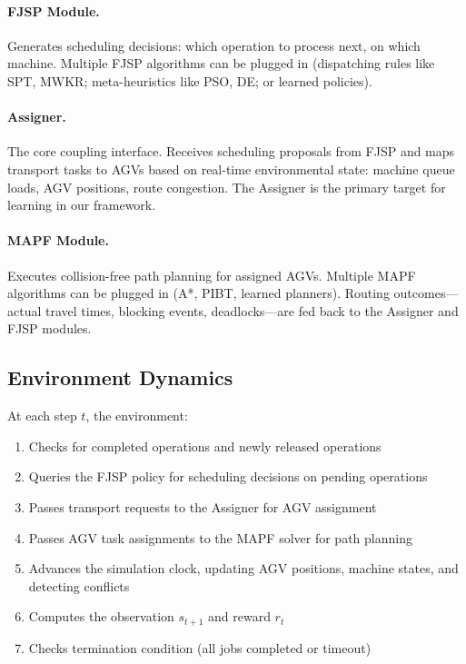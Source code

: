 \documentclass[11pt,a4paper]{article}
\begin{document}
\paragraph{FJSP Module.}
Generates scheduling decisions: which operation to process next, on which machine. Multiple FJSP algorithms can be plugged in (dispatching rules like SPT, MWKR; meta-heuristics like PSO, DE; or learned policies).

\paragraph{Assigner.}
The core coupling interface. Receives scheduling proposals from FJSP and maps transport tasks to AGVs based on real-time environmental state: machine queue loads, AGV positions, route congestion. The Assigner is the primary target for learning in our framework.

\paragraph{MAPF Module.}
Executes collision-free path planning for assigned AGVs. Multiple MAPF algorithms can be plugged in (A*, PIBT, learned planners). Routing outcomes---actual travel times, blocking events, deadlocks---are fed back to the Assigner and FJSP modules.

\subsection{Environment Dynamics}

At each step $t$, the environment:

\begin{enumerate}[leftmargin=*]
    \item Checks for completed operations and newly released operations
    \item Queries the FJSP policy for scheduling decisions on pending operations
    \item Passes transport requests to the Assigner for AGV assignment
    \item Passes AGV task assignments to the MAPF solver for path planning
    \item Advances the simulation clock, updating AGV positions, machine states, and detecting conflicts
    \item Computes the observation $s_{t+1}$ and reward $r_t$
    \item Checks termination condition (all jobs completed or timeout)
\end{enumerate}
\end{document}
